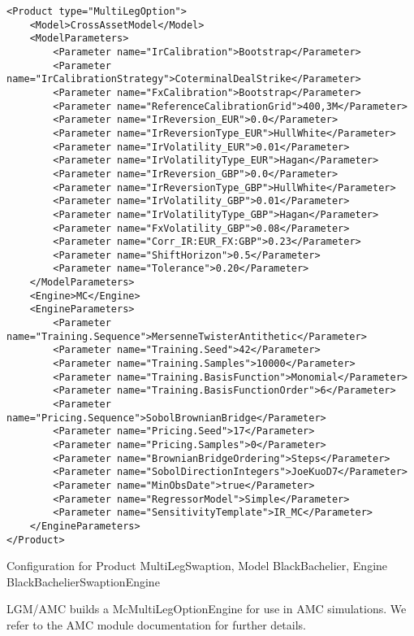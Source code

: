 \begin{longlisting}
\begin{verbatim}
<Product type="MultiLegOption">
    <Model>CrossAssetModel</Model>
    <ModelParameters>
        <Parameter name="IrCalibration">Bootstrap</Parameter>
        <Parameter name="IrCalibrationStrategy">CoterminalDealStrike</Parameter>
        <Parameter name="FxCalibration">Bootstrap</Parameter>
        <Parameter name="ReferenceCalibrationGrid">400,3M</Parameter>
        <Parameter name="IrReversion_EUR">0.0</Parameter>
        <Parameter name="IrReversionType_EUR">HullWhite</Parameter>
        <Parameter name="IrVolatility_EUR">0.01</Parameter>
        <Parameter name="IrVolatilityType_EUR">Hagan</Parameter>
        <Parameter name="IrReversion_GBP">0.0</Parameter>
        <Parameter name="IrReversionType_GBP">HullWhite</Parameter>
        <Parameter name="IrVolatility_GBP">0.01</Parameter>
        <Parameter name="IrVolatilityType_GBP">Hagan</Parameter>
        <Parameter name="FxVolatility_GBP">0.08</Parameter>
        <Parameter name="Corr_IR:EUR_FX:GBP">0.23</Parameter>
        <Parameter name="ShiftHorizon">0.5</Parameter>
        <Parameter name="Tolerance">0.20</Parameter>
    </ModelParameters>
    <Engine>MC</Engine>
    <EngineParameters>
        <Parameter name="Training.Sequence">MersenneTwisterAntithetic</Parameter>
        <Parameter name="Training.Seed">42</Parameter>
        <Parameter name="Training.Samples">10000</Parameter>
        <Parameter name="Training.BasisFunction">Monomial</Parameter>
        <Parameter name="Training.BasisFunctionOrder">6</Parameter>
        <Parameter name="Pricing.Sequence">SobolBrownianBridge</Parameter>
        <Parameter name="Pricing.Seed">17</Parameter>
        <Parameter name="Pricing.Samples">0</Parameter>
        <Parameter name="BrownianBridgeOrdering">Steps</Parameter>
        <Parameter name="SobolDirectionIntegers">JoeKuoD7</Parameter>
        <Parameter name="MinObsDate">true</Parameter>
        <Parameter name="RegressorModel">Simple</Parameter>
        <Parameter name="SensitivityTemplate">IR_MC</Parameter>
    </EngineParameters>
</Product>
\end{verbatim}
\caption{Configuration for Product MultiLegSwaption, Model BlackBachelier, Engine BlackBachelierSwaptionEngine}
\label{lst:peconfig_MultiLegSwaption_LGM_MC}
\end{longlisting}

LGM/AMC builds a McMultiLegOptionEngine for use in AMC simulations. We refer to the AMC module documentation for further
details.

